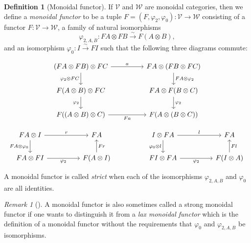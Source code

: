 \documentclass[reqno]{amsart}
\theoremstyle{definition}
\newtheorem{definition}[theorem]{Definition}
\theoremstyle{remark}
\newtheorem*{remark}{Remark}
\begin{document}
   \begin{definition}[Monoidal functor]
       If $\mathcal{V}$ and $\mathcal{W}$ are monoidal categories,
       then we define a \textit{monoidal functor} to be
       a tuple $F = \left( F , \varphi_2, 
       \varphi_0 \right) \colon
       \mathcal{V} \to \mathcal{W}$ consisting of
       a functor $F \colon \mathcal{V} \to \mathcal{W}$,
       a family of natural isomorphisms
       \[
       \varphi_{2, A, B} \colon
       FA \otimes FB \stackrel{\sim}{\to } F\left( A 
       \otimes B \right) ,
       \] 
       and an isomorphism
       $\varphi_0 \colon I \stackrel{\sim}{\to } FI $ such that
       the following three diagrams commute:

       \[\begin{tikzcd}
	{(FA \otimes FB) \otimes FC} && {FA \otimes (F B \otimes FC)} \\
	{F(A \otimes B) \otimes FC} && {FA \otimes F (B \otimes C)} \\
	{F((A \otimes B) \otimes C)} && {F (A \otimes (B \otimes C))}
	\arrow["a", from=1-1, to=1-3]
	\arrow["{\varphi_2 \otimes FC}"', from=1-1, to=2-1]
	\arrow["{FA \otimes \varphi_2}", from=1-3, to=2-3]
	\arrow["{\varphi_2}"', from=2-1, to=3-1]
	\arrow["{\varphi_2}", from=2-3, to=3-3]
	\arrow["Fa"', from=3-1, to=3-3]
\end{tikzcd}\]


\[\begin{tikzcd}
	{FA \otimes I} && FA && {I \otimes FA} && FA \\
	{FA \otimes FI} && {F(A \otimes I)} && {FI \otimes FA} && {F (I \otimes A)}
	\arrow["r", from=1-1, to=1-3]
	\arrow["{FA \otimes \varphi_0}"', from=1-1, to=2-1]
	\arrow["l", from=1-5, to=1-7]
	\arrow["{\varphi_0 \otimes l}"', from=1-5, to=2-5]
	\arrow["{\varphi_2}"', from=2-1, to=2-3]
	\arrow["Fr"', from=2-3, to=1-3]
	\arrow["{\varphi_2}"', from=2-5, to=2-7]
	\arrow["Fl"', from=2-7, to=1-7]
\end{tikzcd}\]

A monoidal functor is called \textit{strict} when each
of the isomorphisms
$\varphi _{2, A, B}$ and $\varphi_0$ are all identities.

   \end{definition}



\begin{remark}[]
    A monoidal functor is also sometimes called a strong
    monoidal functor if one wants to distinguish it
    from a \textit{lax monoidal functor} which is
    the definition of a monoidal functor
    without the requirements that 
    $\varphi_0$ and $\varphi_{2,A,B}$ be isomorphisms.
\end{remark}
\end{document}
